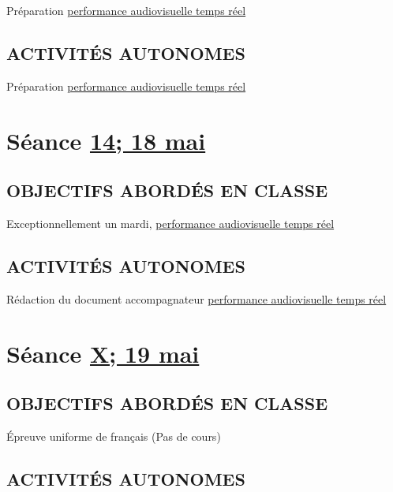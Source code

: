 \documentclass[
]{book}
\begin{document}
Préparation \protect\hyperlink{sommatif_5}{performance audiovisuelle temps réel}

\hypertarget{activituxe9s-autonomes-14}{%
\subsection{ACTIVITÉS AUTONOMES}\label{activituxe9s-autonomes-14}}

Préparation \protect\hyperlink{sommatif_5}{performance audiovisuelle temps réel}

\hypertarget{semaine_16}{%
\section{\texorpdfstring{Séance \protect\hyperlink{semaine_16}{14; 18 mai}}{Séance 14; 18 mai}}\label{semaine_16}}

\hypertarget{objectifs-aborduxe9s-en-classe-15}{%
\subsection{OBJECTIFS ABORDÉS EN CLASSE}\label{objectifs-aborduxe9s-en-classe-15}}

Exceptionnellement un mardi, \protect\hyperlink{sommatif_5}{performance audiovisuelle temps réel}

\hypertarget{activituxe9s-autonomes-15}{%
\subsection{ACTIVITÉS AUTONOMES}\label{activituxe9s-autonomes-15}}

Rédaction du document accompagnateur \protect\hyperlink{sommatif_5}{performance audiovisuelle temps réel}

\hypertarget{semaine_17}{%
\section{\texorpdfstring{Séance \protect\hyperlink{semaine_17}{X; 19 mai}}{Séance X; 19 mai}}\label{semaine_17}}

\hypertarget{objectifs-aborduxe9s-en-classe-16}{%
\subsection{OBJECTIFS ABORDÉS EN CLASSE}\label{objectifs-aborduxe9s-en-classe-16}}

Épreuve uniforme de français (Pas de cours)

\hypertarget{activituxe9s-autonomes-16}{%
\subsection{ACTIVITÉS AUTONOMES}\label{activituxe9s-autonomes-16}}
\end{document}
